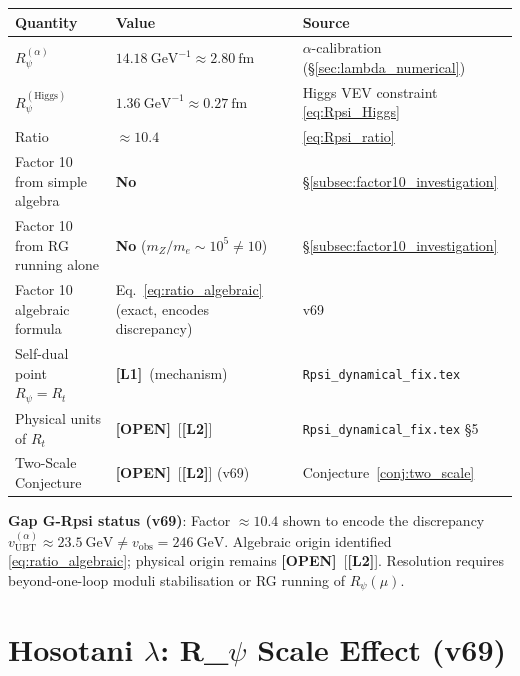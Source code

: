 \documentclass[12pt]{article}
\theoremstyle{definition}
\theoremstyle{remark}
\newcommand{\Lone}{\textbf{[L1]}}
\newcommand{\Ltwo}{\textbf{[L2]}}
\newcommand{\OPEN}{\textbf{[OPEN]}}
\begin{document}
\begin{center}
\begin{tabular}{|l|l|l|}
\hline
\textbf{Quantity} & \textbf{Value} & \textbf{Source} \\
\hline
$R_\psi^{(\alpha)}$ & $14.18~\text{GeV}^{-1} \approx 2.80~\text{fm}$
  & $\alpha$-calibration (§\ref{sec:lambda_numerical}) \\
$R_\psi^{(\text{Higgs})}$ & $1.36~\text{GeV}^{-1} \approx 0.27~\text{fm}$
  & Higgs VEV constraint \eqref{eq:Rpsi_Higgs} \\
Ratio & $\approx 10.4$ & \eqref{eq:Rpsi_ratio} \\
Factor 10 from simple algebra & \textbf{No} & §\ref{subsec:factor10_investigation} \\
Factor 10 from RG running alone & \textbf{No} ($m_Z/m_e\sim10^5 \neq 10$) & §\ref{subsec:factor10_investigation} \\
Factor 10 algebraic formula & Eq.~\eqref{eq:ratio_algebraic} (exact,
  encodes discrepancy) & v69 \\
Self-dual point $R_\psi = R_t$ & \Lone\ (mechanism) & \texttt{Rpsi\_dynamical\_fix.tex} \\
Physical units of $R_t$ & \OPEN\ [\Ltwo] & \texttt{Rpsi\_dynamical\_fix.tex} §5 \\
Two-Scale Conjecture & \OPEN\ [\Ltwo] (v69) & Conjecture~\ref{conj:two_scale} \\
\hline
\end{tabular}
\end{center}

\noindent\textbf{Gap G-Rpsi status (v69)}: Factor $\approx 10.4$ shown to
encode the discrepancy $v_{\text{UBT}}^{(\alpha)} \approx 23.5\ \text{GeV}
\neq v_{\text{obs}} = 246\ \text{GeV}$.  Algebraic origin identified
\eqref{eq:ratio_algebraic}; physical origin remains \OPEN\ [\Ltwo].
Resolution requires beyond-one-loop moduli stabilisation or RG running
of $R_\psi(\mu)$.

\section{Hosotani $\lambda$: R\_\texorpdfstring{$\psi$}{psi} Scale Effect (v69)}
\label{sec:lambda_rpsi_effect}

\end{document}
